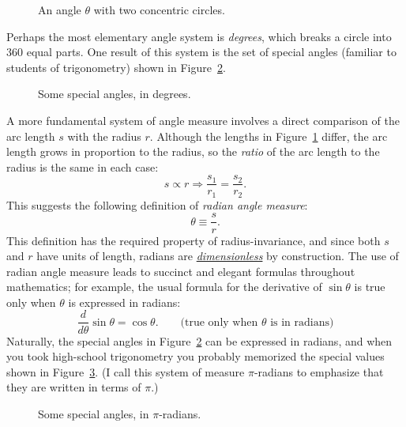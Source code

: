 \begin{figure}
\begin{center}
\end{center}
\caption{An angle $\theta$ with two concentric circles.\label{fig:angle_arclength}}
\end{figure}

Perhaps the most elementary angle system is \emph{degrees}, which breaks a circle into 360 equal parts. One result of this system is the set of special angles (familiar to students of trigonometry) shown in Figure~\ref{fig:degree_angles}.

\begin{figure}
\begin{center}
\end{center}
\caption{Some special angles, in degrees.\label{fig:degree_angles}}
\end{figure}

A more fundamental system of angle measure involves a direct comparison of the arc length $s$ with the radius $r$. Although the lengths in Figure~\ref{fig:angle_arclength} differ, the arc length grows in proportion to the radius, so the \emph{ratio} of the arc length to the radius is the same in each case:
\[
s\propto r \Rightarrow \frac{s_1}{r_1} = \frac{s_2}{r_2}.
\]
This suggests the following definition of \emph{radian angle measure}:
\[ \theta \equiv \frac{s}{r}. \]
This definition has the required property of radius-invariance, and since both $s$ and $r$ have units of length, radians are \href{http://en.wikipedia.org/wiki/Dimensionless_quantity}{\emph{dimensionless}} by construction. The use of radian angle measure leads to succinct and elegant formulas throughout mathematics; for example, the usual formula for the derivative of $\sin\theta$ is true only when $\theta$ is expressed in radians:
\[
  \frac{d}{d\theta}\sin\theta = \cos\theta. \qquad\mbox{(true only when $\theta$ is in radians)}
\]
Naturally, the special angles in Figure~\ref{fig:degree_angles} can be expressed in radians, and when you took high-school trigonometry you probably memorized the special values shown in Figure~\ref{fig:pi_angles}. (I call this system of measure $\pi$-radians to emphasize that they are written in terms of $\pi$.)

\begin{figure}
\begin{center}
\end{center}
\caption{Some special angles, in $\pi$-radians.\label{fig:pi_angles}}
\end{figure}


